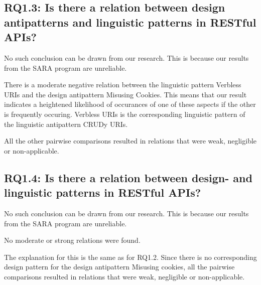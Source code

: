 \subsection{RQ1.3: Is there a relation between design antipatterns and linguistic patterns in RESTful APIs?}

No such conclusion can be drawn from our research. This is because our results from the SARA program are unreliable.

There is a moderate negative relation between the linguistic pattern Verbless URIs and the design antipattern Misusing Cookies. This means that our result indicates a heightened likelihood of occurances of one of these aspects if the other is frequently occuring. Verbless URIs is the corresponding linguistic pattern of the linguistic antipattern CRUDy URIs. 

All the other pairwise comparisons resulted in relations that were weak, negligible or non-applicable. 

\subsection{RQ1.4: Is there a relation between design- and linguistic patterns in RESTful APIs?}

No such conclusion can be drawn from our research. This is because our results from the SARA program are unreliable.

No moderate or strong relations were found.

The explanation for this is the same as for RQ1.2. Since there is no corresponding design pattern for the design antipattern Misusing cookies, all the pairwise comparisons resulted in relations that were weak, negligible or non-applicable. 

\newpage